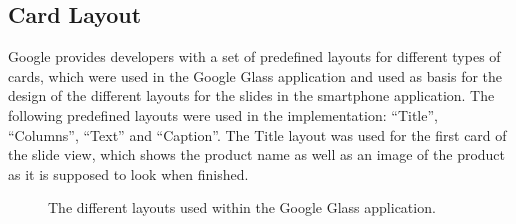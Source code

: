 

\subsection{Card Layout}
Google provides developers with a set of predefined layouts for different types of cards, which were used in the Google Glass application and used as basis for the design of the different layouts for the slides in the smartphone application. The following predefined layouts were used in the implementation: ``Title'', ``Columns'', ``Text'' and ``Caption''. The Title layout was used for the first card of the slide view, which shows the product name as well as an image of the product as it is supposed to look when finished. 

	\begin{figure}[ht!]
		\centering
   		 \qquad
   		 \qquad
    		\qquad
   		 \qquad
		\caption{The different layouts used within the Google Glass application.}
		\label{fig:cardLayout}
	\end{figure}

